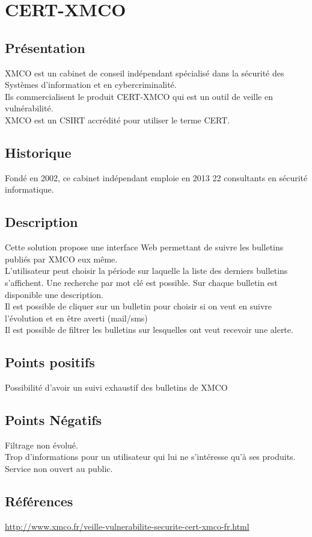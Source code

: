 \section{CERT-XMCO}
\thispagestyle{plain}
\subsection{Présentation}
XMCO est un cabinet de conseil indépendant spécialisé dans la sécurité des Systèmes d’information et en cybercriminalité.\\
Ils commercialisent le produit CERT-XMCO qui est un outil de veille en vulnérabilité.\\
XMCO est un CSIRT accrédité pour utiliser le terme CERT.\\

\subsection{Historique}
Fondé en 2002, ce cabinet indépendant emploie en 2013 22 consultants en sécurité informatique.

\subsection{Description}
Cette solution propose une interface Web permettant de suivre les bulletins publiés par XMCO eux même.\\
L’utilisateur peut choisir la période sur laquelle la liste des derniers bulletins s’affichent. Une recherche par mot clé est possible. Sur chaque bulletin est disponible une description.\\
Il est possible de cliquer sur un bulletin pour choisir si on veut en suivre l’évolution et en être averti (mail/sms)\\
Il est possible de filtrer les bulletins sur lesquelles ont veut recevoir une alerte.\\

\subsection{Points positifs}
Possibilité d’avoir un suivi exhaustif des bulletins de XMCO

\subsection{Points Négatifs}
Filtrage non évolué.\\
Trop d’informations pour un utilisateur qui lui ne s’intéresse qu’à ses produits.\\
Service non ouvert au public.\\

\subsection{Références}
\small
\noindent
\url{http://www.xmco.fr/veille-vulnerabilite-securite-cert-xmco-fr.html}
\normalsize